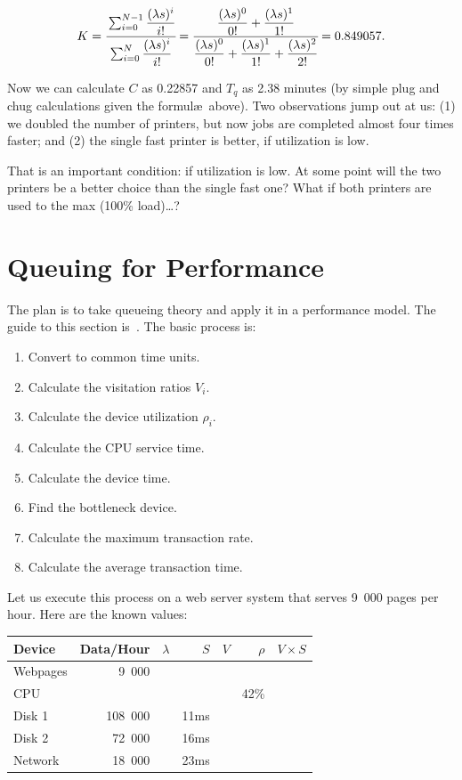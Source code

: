 \documentclass[a4paper]{report}
\begin{document}
\[K = \cfrac{\sum_{i=0}^{N-1}\dfrac{(\lambda s)^{i}}{i!}}{{\sum_{i=0}^{N}\dfrac{(\lambda s)^{i}}{i!}}} = \cfrac{\dfrac{(\lambda s)^{0}}{0!} + \dfrac{(\lambda s)^{1}}{1!}}{\dfrac{(\lambda s)^{0}}{0!} + \dfrac{(\lambda s)^{1}}{1!} + \dfrac{(\lambda s)^{2}}{2!}} = 0.849057.\]

Now we can calculate $C$ as 0.22857 and $T_{q}$ as 2.38 minutes (by simple plug and chug calculations given the formul\ae\  above). Two observations jump out at us: (1) we doubled the number of printers, but now jobs are completed almost four times faster; and (2) the single fast printer is better, if utilization is low.

That is an important condition: if utilization is low. At some point will the two printers be a better choice than the single fast one? What if both printers are used to the max (100\% load)\ldots?

\section*{Queuing for Performance}

The plan is to take queueing theory and apply it in a performance model. The guide to this section is~\cite{williams-perf}. The basic process is:

\begin{enumerate}[noitemsep]
	\item Convert to common time units.
	\item Calculate the visitation ratios $V_{i}$.
	\item Calculate the device utilization $\rho_{i}$.
	\item Calculate the CPU service time.
	\item Calculate the device time.
	\item Find the bottleneck device.
	\item Calculate the maximum transaction rate.
	\item Calculate the average transaction time.
\end{enumerate}

Let us execute this process on a web server system that serves 9~000 pages per hour. Here are the known values:

\begin{center}
\begin{tabular}{l|r|r|r|r|r|r} 
	\textbf{Device} & \textbf{Data/Hour} & \textbf{$\lambda$} & \textbf{$S$} & \textbf{$V$} & \textbf{$\rho$} & \textbf{$V \times S$} \\ \hline
	Webpages & 9~000 & & & & & \\ \hline
	CPU & & & & &  42\% & \\ \hline
	Disk 1 & 108~000 & & 11ms & & &\\ \hline
	Disk 2 & 72~000 & & 16ms & & &\\ \hline
	Network & 18~000 & & 23ms & & &
\end{tabular}
\end{center}
\end{document}
